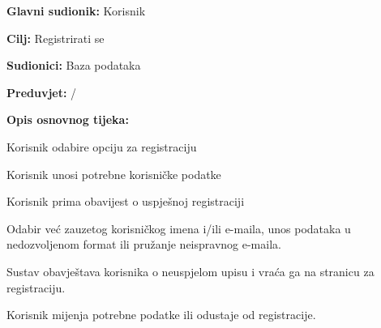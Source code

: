				
				\noindent {}
				\begin{packed_item}
	
						\item \textbf{Glavni sudionik: }Korisnik
						\item  \textbf{Cilj:} Registrirati se
						\item  \textbf{Sudionici:} Baza podataka
						\item  \textbf{Preduvjet:} /
						\item  \textbf{Opis osnovnog tijeka:}
						
						\item[] \begin{packed_enum}
	
							\item Korisnik odabire opciju za registraciju
							\item Korisnik unosi potrebne korisničke podatke
							\item Korisnik prima obavijest o uspješnoj registraciji
						\end{packed_enum}
						
						\item[] \begin{packed_item}
	
							\item[1] Odabir već zauzetog korisničkog imena i/ili e-maila, unos podataka u        nedozvoljenom format ili pružanje neispravnog e-maila.
							\item[] \begin{packed_enum}
								
								\item  Sustav obavještava korisnika o neuspjelom upisu i vraća ga na stranicu za registraciju.
								\item Korisnik mijenja potrebne podatke ili odustaje od registracije.

							\end{packed_enum}
						\end{packed_item}						
				\end{packed_item}

